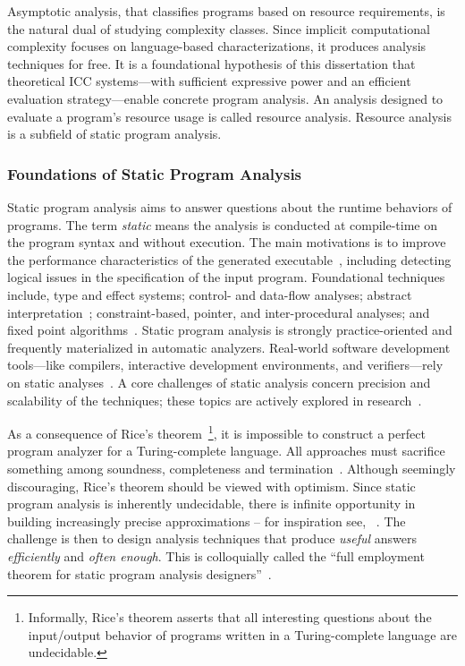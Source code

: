 Asymptotic analysis, that classifies programs based on resource requirements, is the natural dual of studying complexity classes.
Since implicit computational complexity focuses on language-based characterizations, it produces analysis techniques for free.
It is a foundational hypothesis of this dissertation that theoretical ICC systems---with sufficient expressive power and an efficient evaluation strategy---enable concrete program analysis.
An analysis designed to evaluate a program's resource usage is called resource analysis.
Resource analysis is a subfield of static program analysis.

\subsubsection{Foundations of Static Program Analysis}\label{static-analysis-basics}

Static program analysis aims to answer questions about the runtime behaviors of programs.
The term \emph{static} means the analysis is conducted at compile-time on the program syntax and without execution.
The main motivations is to improve the performance characteristics of the generated executable~\cite{nielson2010,kennedy2001},
including detecting logical issues in the specification of the input program.
Foundational techniques include, \eg
type and effect systems;
control- and data-flow analyses;
abstract interpretation~\cite{cousot2021};
constraint-based, pointer, and inter-procedural analyses;
and fixed point algorithms~\cite{nielson2010,moller2023}.
Static program analysis is strongly practice-oriented and frequently materialized in automatic analyzers.
Real-world software development tools---like compilers, interactive development environments, and verifiers---rely on static analyses~\cite{livshits2015}.
A core challenges of static analysis concern precision and scalability of the techniques;
these topics are actively explored in research~\cite{schiebel2024}.

As a consequence of Rice's theorem~\cite{rice1953}\footnote{
Informally, Rice's theorem asserts that all interesting questions about the input/output behavior of programs written in a Turing-complete language are undecidable.}, it is impossible to construct a perfect program analyzer for a Turing-complete language.
All approaches must sacrifice something among soundness, completeness and termination~\cite{moller2024}.
Although seemingly discouraging, Rice's theorem should be viewed with optimism.
Since static program analysis is inherently undecidable, there is infinite opportunity in building increasingly precise approximations --
for inspiration see, \eg~\textcite{ding2023}.
The challenge is then to design analysis techniques that produce \emph{useful} answers \emph{efficiently} and \emph{often enough}.
This is colloquially called the \enquote{full employment theorem for static program analysis designers}~\cite[p. 4]{moller2023}.

